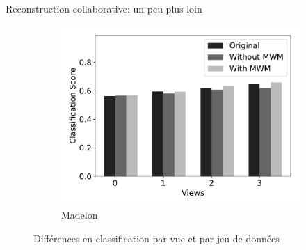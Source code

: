 \documentclass[hyperref={pdfpagelabels=false}]{beamer}
\begin{document}
\begin{frame}{Reconstruction collaborative: un peu plus loin}
\begin{figure}[!h]
\begin{subfigure}[c]{0.45\textwidth}
                \includegraphics[scale=.26]{cs_madelon}
                \caption{Madelon}
            \end{subfigure}
            \caption{Différences en classification par vue et par jeu de 
            données}
        \end{figure}
    \end{frame}
\end{document}
